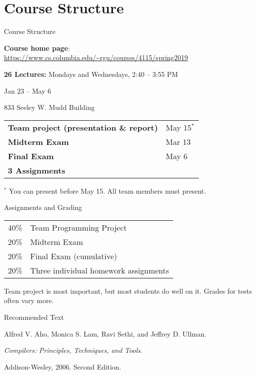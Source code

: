 \documentclass{plt}
\begin{document}
\part{Course Structure}

\begin{frame}{Course Structure}

\textbf{Course home page}:
\url{https://www.cs.columbia.edu/~rgu/courses/4115/spring2019}


\textbf{26 Lectures:} Mondays and Wednesdays, 2:40 -- 3:55 PM

Jan 23 -- May 6

833 Seeley W. Mudd Building

\vfill

\renewcommand{\arraystretch}{1.3}
\begin{tabular}{@{}ll}
\textbf{Team project (presentation \& report)} & May 15$^*$\\
\textbf{Midterm Exam} & Mar 13\\
\textbf{Final Exam} & May 6\\
\textbf{3 Assignments} & \\
\end{tabular}
\medskip

{\footnotesize $^*$ You can present before May 15.  All team members
  must present.}

\end{frame}


\begin{frame}{Assignments and Grading}

\renewcommand{\arraystretch}{1.5}
\begin{tabular}{rl}
40\% & Team Programming Project \\

20\% & Midterm Exam \\

20\% & Final Exam (cumulative) \\

20\% & Three individual homework assignments \\

\end{tabular}

\vfill

Team project is most important, but most students do well on it.
Grades for tests often vary more.

\end{frame}

\begin{frame}{Recommended Text}
\begin{minipage}{0.6\textwidth}
\raggedright\parskip=1pc
Alfred V. Aho, Monica S. Lam, \break Ravi Sethi, and Jeffrey D. Ullman.

\textit{Compilers: Principles, Techniques, and Tools}.

Addison-Wesley, 2006. \break Second Edition.
\end{minipage}
\begin{minipage}{0.35\textwidth}
\end{minipage}
\end{frame}
\end{document}
